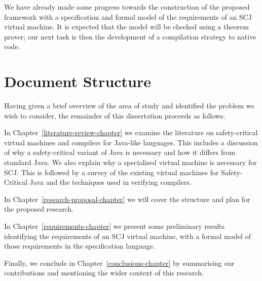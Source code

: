 \documentclass[a4paper,10pt]{report}
\begin{document}
We have already made some progress towards the construction of the proposed
framework with a specification and formal model of the requirements of an SCJ
virtual machine.  It is expected that the model will be checked using a theorem
prover; our next task is then the development of a compilation strategy to
native code.

\section{Document Structure}

Having given a brief overview of the area of study and identified the problem we
wish to consider, the remainder of this dissertation proceeds as follows.

In Chapter~\ref{literature-review-chapter} we examine the literature on
safety-critical virtual machines and compilers for Java-like languages. This
includes a discussion of why a safety-critical variant of Java is necessary and
how it differs from standard Java.  We also explain why a specialised virtual
machine is necessary for SCJ.  This is followed by a survey of the existing
virtual machines for Safety-Critical Java and the techniques used in verifying
compilers.

In Chapter~\ref{research-proposal-chapter} we will cover the structure and
plan for the proposed research.

In Chapter~\ref{requirements-chapter} we present some preliminary results
identifying the requirements of an SCJ virtual machine, with a formal model of
those requirements in the \Circus{} specification language.

Finally, we conclude in Chapter~\ref{conclusions-chapter} by summarising our
contributions and mentioning the wider context of this research.

\end{document}

